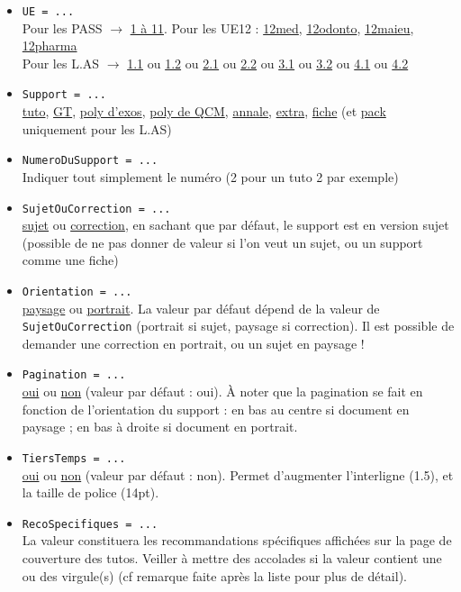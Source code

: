 \documentclass[a4paper,11pt]{article}
\begin{document}
\begin{itemize}
    \item \texttt{UE = ...}\\
        Pour les PASS $\rightarrow$ \uline{1 à 11}. Pour les UE12 : \uline{12med}, \uline{12odonto}, \uline{12maieu}, \uline{12pharma}\\
        Pour les L.AS $\rightarrow$ \uline{1.1} ou \uline{1.2} ou \uline{2.1} ou \uline{2.2} ou \uline{3.1} ou \uline{3.2} ou \uline{4.1} ou \uline{4.2}
    \item \texttt{Support = ...}\\
        \uline{tuto}, \uline{GT}, \uline{poly d'exos}, \uline{poly de QCM}, \uline{annale}, \uline{extra}, \uline{fiche} (et \uline{pack} uniquement pour les L.AS)
    \item \texttt{NumeroDuSupport = ...}\\
        Indiquer tout simplement le numéro (2 pour un tuto 2 par exemple)
    \item \texttt{SujetOuCorrection = ...}\\
        \uline{sujet} ou \uline{correction}, en sachant que par défaut, le support est en version sujet (possible de ne pas donner de valeur si l'on veut un sujet, ou un support comme une fiche)
    \item \texttt{Orientation = ...}\\
        \uline{paysage} ou \uline{portrait}. La valeur par défaut dépend de la valeur de \texttt{SujetOuCorrection} (portrait si sujet, paysage si correction). Il est possible de demander une correction en portrait, ou un sujet en paysage !
    \item \texttt{Pagination = ...}\\
        \uline{oui} ou \uline{non} (valeur par défaut : oui). À noter que la pagination se fait en fonction de l'orientation du support : en bas au centre si document en paysage ; en bas à droite si document en portrait.
    \item \texttt{TiersTemps = ...}\\
        \uline{oui} ou \uline{non} (valeur par défaut : non). Permet d'augmenter l'interligne (1.5), et la taille de police (14pt).
    \item \texttt{RecoSpecifiques = ...}\\
        La valeur constituera les recommandations spécifiques affichées sur la page de couverture des tutos. Veiller à mettre des accolades si la valeur contient une ou des virgule(s) (cf remarque faite après la liste pour plus de détail).

\end{itemize}
\end{document}
